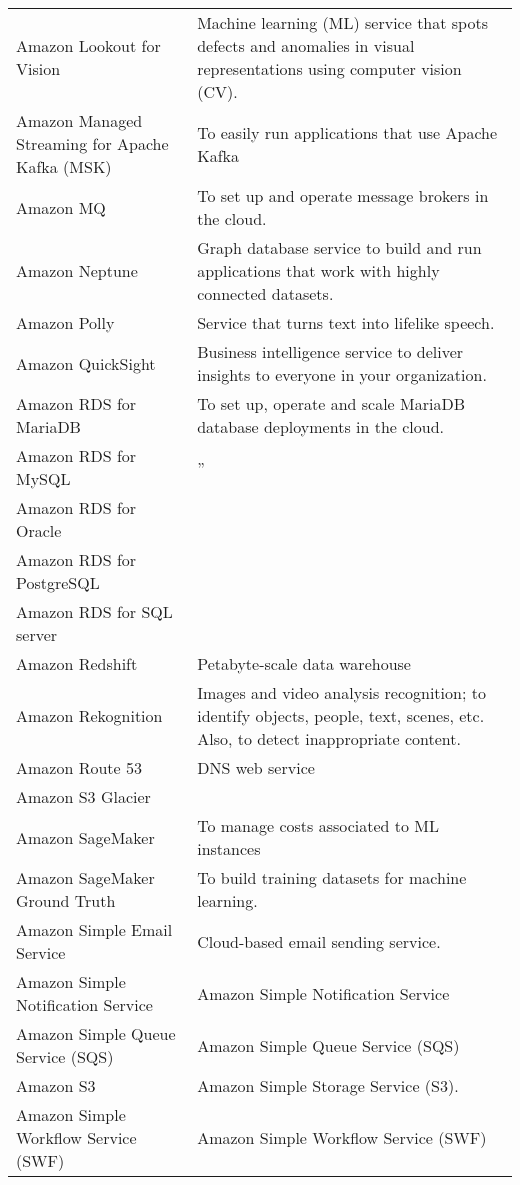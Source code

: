 \documentclass[]{book}
\begin{document}
\begin{table}
\begin{tabular}[t]{ll}
Amazon Lookout for Vision & Machine learning (ML) service that spots defects and anomalies in visual representations using computer vision (CV).\\
Amazon Managed Streaming for Apache Kafka (MSK) & To easily run applications that use Apache Kafka\\
Amazon MQ & To set up and operate message brokers in the cloud.\\
\addlinespace
Amazon Neptune & Graph database service to build and run applications that work with highly connected datasets.\\
Amazon Polly & Service that turns text into lifelike speech.\\
Amazon QuickSight & Business intelligence service to deliver insights to everyone in your organization.\\
Amazon RDS for MariaDB & To set up, operate and scale MariaDB database deployments in the cloud.\\
Amazon RDS for MySQL & ''\\
\addlinespace
Amazon RDS for Oracle & \\
Amazon RDS for PostgreSQL & \\
Amazon RDS for SQL server & \\
Amazon Redshift & Petabyte-scale data warehouse\\
Amazon Rekognition & Images and video analysis recognition; to identify objects, people, text, scenes, etc. Also, to detect inappropriate content.\\
\addlinespace
Amazon Route 53 & DNS web service\\
Amazon S3 Glacier & \\
Amazon SageMaker & To manage costs associated to ML instances\\
Amazon SageMaker Ground Truth & To build training datasets for machine learning.\\
Amazon Simple Email Service & Cloud-based email sending service.\\
\addlinespace
Amazon Simple Notification Service & Amazon Simple Notification Service\\
Amazon Simple Queue Service (SQS) & Amazon Simple Queue Service (SQS)\\
Amazon S3 & Amazon Simple Storage Service (S3).\\
Amazon Simple Workflow Service (SWF) & Amazon Simple Workflow Service (SWF)\\
\bottomrule
\end{tabular}
\end{table}
\end{document}
